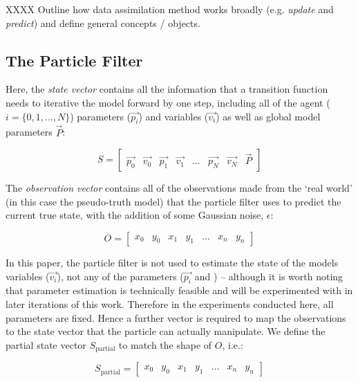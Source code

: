 XXXX Outline how data assimilation method works broadly (e.g. \textit{update} and \textit{predict}) and define general concepts / objects.


\subsection{The Particle Filter}

Here, the \textit{state vector} contains all the information that a transition function needs to iterative the model forward by one step, including all of the agent ($i = \{ 0, 1, \dots, N \} $) parameters ($\overrightarrow{p_i}$) and variables ($\overrightarrow{v_i}$) as well as global model parameters $\overrightarrow{P}$:

\begin{equation}
  S  = \left[ \begin{array}{cccccccc}
\overrightarrow{p_0} & \overrightarrow{v_0} & \overrightarrow{p_1} &  \overrightarrow{v_1} &  \dots &  \overrightarrow{p_N} &  \overrightarrow{v_N} & \overrightarrow{P} 
\end{array} \right]
\end{equation} 

The \textit{observation vector} contains all of the observations made from the `real world' (in this case the pseudo-truth model) that the particle filter uses to predict the current true state, with the addition of some Gaussian noise, $\epsilon$:

\begin{equation}
  O  = \left[ \begin{array}{ccccccc}
x_0 & y_0 & x_1 & y_1 & \dots & x_n & y_n 
\end{array} \right]
\end{equation} 

In this paper, the particle filter is not used to estimate the state of the models variables ($\overrightarrow{v_i}$), not any of the parameters ($\overrightarrow{p_i}$ and ) -- although it is worth noting that parameter estimation is technically feasible and will be experimented with in later iterations of this work. Therefore in the experiments conducted here, all parameters are fixed. Hence a further vector is required to map the observations to the state vector that the particle can actually manipulate. We define the partial state vector $S_\textrm{partial}$ to match the shape of $O$, i.e.:

\begin{equation}
  S_\textrm{partial}  = \left[ \begin{array}{ccccccc}
x_0 & y_0 & x_1 & y_1 & \dots & x_n & y_n 
\end{array} \right]
\end{equation} 

